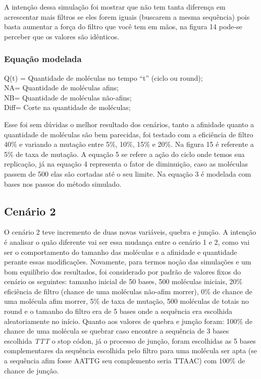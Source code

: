 
A intenção dessa simulação foi mostrar que não tem tanta diferença em
acrescentar mais filtros se eles forem iguais (buscarem a mesma sequência) pois basta
aumentar a força do filtro que você tem em mãos, na figura 14 pode-se perceber que os
valores são idênticos. 

\subsubsection{Equação modelada}

Q(t) = Quantidade de moléculas no tempo “t” (ciclo ou round);\\ 
NA= Quantidade de moléculas afins;\\
NB= Quantidade de moléculas não-afins;\\
Diff= Corte na quantidade de moléculas;


Esse foi sem dúvidas o melhor resultado dos cenários, tanto a afinidade quanto a
quantidade de moléculas são bem parecidas, foi testado com a eficiência de filtro 40\% e
variando a mutação entre 5\%, 10\%, 15\% e 20\%. Na figura 15 é referente a 5\% de taxa de
mutação. A equação 5 se refere a ação do ciclo onde temos sua replicação, já na equação
4 representa o fator de diminuição, caso as moléculas passem de 500 elas são cortadas até
o seu limite. Na equação 3 é modelada com bases nos passos do método simulado.

\subsection{Cenário 2}

O cenário 2 teve incremento de duas novas variáveis, quebra e junção. A intenção é
analisar o quão diferente vai ser essa mudança entre o cenário 1 e 2, como vai ser o
comportamento do tamanho das moléculas e a afinidade e quantidade perante essas
modificações. Novamente, para termos noção das simulações e um bom equilíbrio dos
resultados, foi considerado por padrão de valores fixos do cenário os seguintes: tamanho
inicial de 50 bases, 500 moléculas iniciais, 20\% eficiência de filtro (chance de uma
moléculas não-afim morrer), 0\% de chance de uma molécula afim morrer, 5\% de taxa de
mutação, 500 moléculas de totais no round e o tamanho do filtro era de 5 bases onde a
sequência era escolhida aleatoriamente no início. Quanto aos valores de quebra e junção
foram: 100\% de chance de uma molécula se quebrar caso encontre a sequência de 3 bases
escolhida \emph{TTT} o stop códon, já o processo de junção, foram escolhidas as 5 bases
complementares da sequência escolhida pelo filtro para uma molécula ser apta (se a
sequência afim fosse AATTG seu complemento seria TTAAC) com 100\% de chance de junção.

